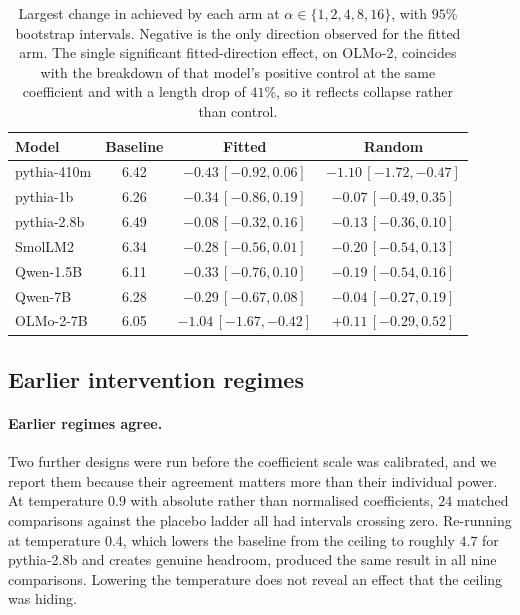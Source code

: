 \begin{table}[t]
\centering
\small
\setlength{\tabcolsep}{8pt}
\begin{tabular}{lccc}
\toprule
Model & Baseline & Fitted & Random \\
\midrule
pythia-410m  & 6.42 & $-0.43\,[-0.92, 0.06]$ & $-1.10\,[-1.72,-0.47]$ \\
pythia-1b    & 6.26 & $-0.34\,[-0.86, 0.19]$ & $-0.07\,[-0.49, 0.35]$ \\
pythia-2.8b  & 6.49 & $-0.08\,[-0.32, 0.16]$ & $-0.13\,[-0.36, 0.10]$ \\
SmolLM2      & 6.34 & $-0.28\,[-0.56, 0.01]$ & $-0.20\,[-0.54, 0.13]$ \\
Qwen-1.5B    & 6.11 & $-0.33\,[-0.76, 0.10]$ & $-0.19\,[-0.54, 0.16]$ \\
Qwen-7B      & 6.28 & $-0.29\,[-0.67, 0.08]$ & $-0.04\,[-0.27, 0.19]$ \\
OLMo-2-7B    & 6.05 & $-1.04\,[-1.67,-0.42]$ & $+0.11\,[-0.29, 0.52]$ \\
\bottomrule
\end{tabular}
\caption{Largest change in \vendi{} achieved by each arm at $\alpha \in \{1,2,4,8,16\}$, with $95\%$
bootstrap intervals. Negative is the only direction observed for the fitted arm. The single
significant fitted-direction effect, on OLMo-2, coincides with the breakdown of that model's
positive control at the same coefficient and with a length drop of $41\%$, so it reflects collapse
rather than control.}
\label{tab:interventions}
\end{table}

\subsection{Earlier intervention regimes}

\paragraph{Earlier regimes agree.}
Two further designs were run before the coefficient scale was calibrated, and we report them because
their agreement matters more than their individual power. At temperature $0.9$ with absolute rather
than normalised coefficients, $24$ matched comparisons against the placebo ladder all had intervals
crossing zero. Re-running at temperature $0.4$, which lowers the baseline \vendi{} from the ceiling
to roughly $4.7$ for pythia-2.8b and creates genuine headroom, produced the same result in all nine
comparisons. Lowering the temperature does not reveal an effect that the ceiling was hiding.


